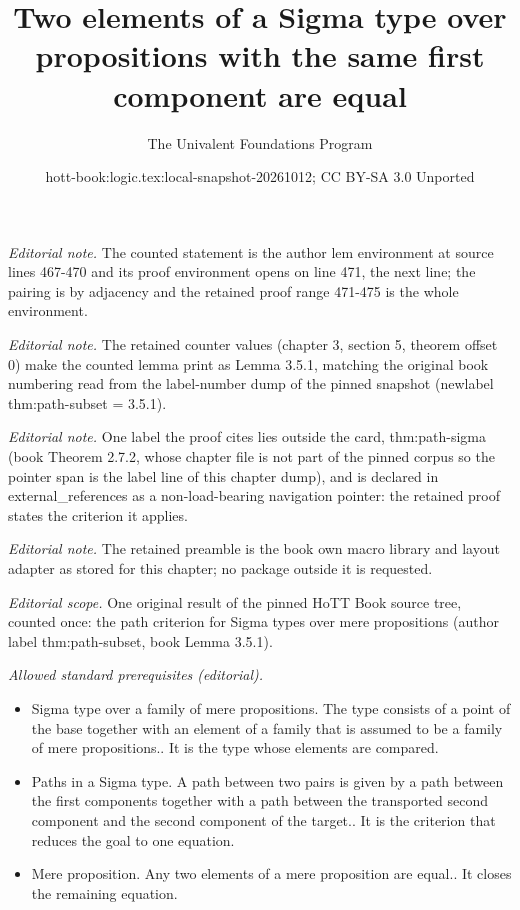 \documentclass[10pt,a4paper]{article}
\title{Two elements of a Sigma type over propositions with the same first component are equal}
\author{The Univalent Foundations Program}
\date{hott-book:logic.tex:local-snapshot-20261012; CC BY-SA 3.0 Unported}
\newcounter{chapter}
\theoremstyle{definition}
\theoremstyle{remark}
\numberwithin{equation}{section}
\begin{document}
\maketitle
\setcounter{chapter}{3}
\setcounter{section}{5}
\setcounter{thm}{0}
\noindent\textit{Editorial note.} The counted statement is the author lem environment at source lines 467-470 and its proof environment opens on line 471, the next line; the pairing is by adjacency and the retained proof range 471-475 is the whole environment.\par\medskip
\noindent\textit{Editorial note.} The retained counter values (chapter 3, section 5, theorem offset 0) make the counted lemma print as Lemma 3.5.1, matching the original book numbering read from the label-number dump of the pinned snapshot (newlabel thm:path-subset = 3.5.1).\par\medskip
\noindent\textit{Editorial note.} One label the proof cites lies outside the card, thm:path-sigma (book Theorem 2.7.2, whose chapter file is not part of the pinned corpus so the pointer span is the label line of this chapter dump), and is declared in external\_references as a non-load-bearing navigation pointer: the retained proof states the criterion it applies.\par\medskip
\noindent\textit{Editorial note.} The retained preamble is the book own macro library and layout adapter as stored for this chapter; no package outside it is requested.\par\medskip
\noindent\textit{Editorial scope.} One original result of the pinned HoTT Book source tree, counted once: the path criterion for Sigma types over mere propositions (author label thm:path-subset, book Lemma 3.5.1).\par\medskip
\noindent\textit{Allowed standard prerequisites (editorial).}\begin{itemize}
\item Sigma type over a family of mere propositions. The type consists of a point of the base together with an element of a family that is assumed to be a family of mere propositions.. It is the type whose elements are compared.
\item Paths in a Sigma type. A path between two pairs is given by a path between the first components together with a path between the transported second component and the second component of the target.. It is the criterion that reduces the goal to one equation.
\item Mere proposition. Any two elements of a mere proposition are equal.. It closes the remaining equation.
\end{itemize}\medskip
\end{document}
